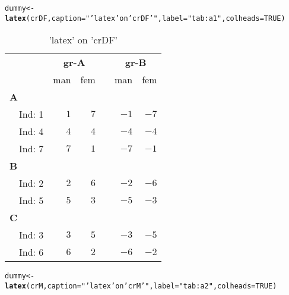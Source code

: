 \documentclass{article}\usepackage[]{graphicx}\usepackage[]{color}
\makeatletter
\newcommand{\hlnum}[1]{\textcolor[rgb]{0.686,0.059,0.569}{#1}}%
\newcommand{\hlstr}[1]{\textcolor[rgb]{0.192,0.494,0.8}{#1}}%
\newcommand{\hlstd}[1]{\textcolor[rgb]{0.345,0.345,0.345}{#1}}%
\newcommand{\hlkwb}[1]{\textcolor[rgb]{0.69,0.353,0.396}{#1}}%
\newcommand{\hlkwc}[1]{\textcolor[rgb]{0.333,0.667,0.333}{#1}}%
\newcommand{\hlkwd}[1]{\textcolor[rgb]{0.737,0.353,0.396}{\textbf{#1}}}%
\newenvironment{kframe}{%
 \def\at@end@of@kframe{}%
 \ifinner\ifhmode%
  \def\at@end@of@kframe{\end{minipage}}%
  \begin{minipage}{\columnwidth}%
 \fi\fi%
 \def\FrameCommand##1{\hskip\@totalleftmargin \hskip-\fboxsep
 \colorbox{shadecolor}{##1}\hskip-\fboxsep
     \hskip-\linewidth \hskip-\@totalleftmargin \hskip\columnwidth}%
 \MakeFramed {\advance\hsize-\width
   \@totalleftmargin\z@ \linewidth\hsize
   \@setminipage}}%
 {\par\unskip\endMakeFramed%
 \at@end@of@kframe}
\makeatother
\begin{document}
\begin{kframe}
\begin{alltt}
\hlstd{dummy} \hlkwb{<-} \hlkwd{latex}\hlstd{(crDF,} \hlkwc{caption}\hlstd{=}\hlstr{"'latex' on 'crDF'"}\hlstd{,} \hlkwc{label}\hlstd{=}\hlstr{"tab:a1"}\hlstd{,} \hlkwc{colheads}\hlstd{=}\hlnum{TRUE}\hlstd{)}
\end{alltt}
\end{kframe}%
\begin{table}[!tbp]
\caption{'latex' on 'crDF'\label{tab:a1}} 
\begin{center}
\begin{tabular}{lrrcrr}
\hline\hline
\multicolumn{1}{l}{\bfseries }&\multicolumn{2}{c}{\bfseries gr-A}&\multicolumn{1}{c}{\bfseries }&\multicolumn{2}{c}{\bfseries gr-B}\tabularnewline
\cline{2-3} \cline{5-6}
\multicolumn{1}{l}{}&\multicolumn{1}{c}{man}&\multicolumn{1}{c}{fem}&\multicolumn{1}{c}{}&\multicolumn{1}{c}{man}&\multicolumn{1}{c}{fem}\tabularnewline
\hline
{\bfseries A}&&&&&\tabularnewline
~~Ind: 1&$1$&$7$&&$-1$&$-7$\tabularnewline
~~Ind: 4&$4$&$4$&&$-4$&$-4$\tabularnewline
~~Ind: 7&$7$&$1$&&$-7$&$-1$\tabularnewline
\hline
{\bfseries B}&&&&&\tabularnewline
~~Ind: 2&$2$&$6$&&$-2$&$-6$\tabularnewline
~~Ind: 5&$5$&$3$&&$-5$&$-3$\tabularnewline
\hline
{\bfseries C}&&&&&\tabularnewline
~~Ind: 3&$3$&$5$&&$-3$&$-5$\tabularnewline
~~Ind: 6&$6$&$2$&&$-6$&$-2$\tabularnewline
\hline
\end{tabular}\end{center}

\end{table}
\begin{kframe}\begin{alltt}
\hlstd{dummy} \hlkwb{<-} \hlkwd{latex}\hlstd{(crM,} \hlkwc{caption}\hlstd{=}\hlstr{"'latex' on 'crM'"}\hlstd{,} \hlkwc{label}\hlstd{=}\hlstr{"tab:a2"}\hlstd{,} \hlkwc{colheads}\hlstd{=}\hlnum{TRUE}\hlstd{)}
\end{alltt}
\end{kframe}%
\end{document}
